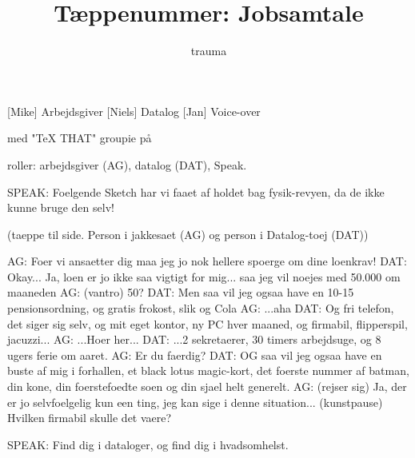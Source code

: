 \documentclass[danish]{article}
\title{Tæppenummer: Jobsamtale}
\author{trauma}
\begin{document}
\maketitle

\begin{roles}
  [Mike] Arbejdsgiver
  [Niels] Datalog
  [Jan] Voice-over
\end{roles}

\begin{props}
   med "TeX THAT" groupie på
\end{props}

\begin{sketch}

roller: arbejdsgiver (AG), datalog (DAT), Speak.

SPEAK: Foelgende Sketch har vi faaet af holdet bag fysik-revyen, da de ikke
kunne bruge den selv!

(taeppe til side. Person i jakkesaet (AG) og person i Datalog-toej (DAT))

AG:  Foer vi ansaetter dig maa jeg jo nok hellere spoerge om dine loenkrav!
DAT: Okay... Ja, loen er jo ikke saa vigtigt for mig... saa jeg vil noejes
med 50.000 om maaneden
AG:  (vantro) 50?
DAT: Men saa vil jeg ogsaa have en 10-15 pensionsordning, og gratis frokost,
slik og Cola
AG:  ...aha
DAT: Og fri telefon, det siger sig selv, og mit eget kontor, ny PC hver
maaned, og firmabil, flipperspil, jacuzzi...
AG:  ...Hoer her...
DAT: ...2 sekretaerer, 30 timers arbejdsuge, og 8 ugers ferie om aaret.
AG:  Er du faerdig?
DAT: OG saa vil jeg ogsaa have en buste af mig i forhallen, et black lotus
magic-kort, det foerste nummer af batman, din kone, din foerstefoedte soen
og din sjael helt generelt.
AG:  (rejser sig) Ja, der er jo selvfoelgelig kun een ting, jeg kan sige i
denne situation... (kunstpause) Hvilken firmabil skulle det vaere?

SPEAK: Find dig i dataloger, og find dig i hvadsomhelst.

\end{sketch}
\end{document}
